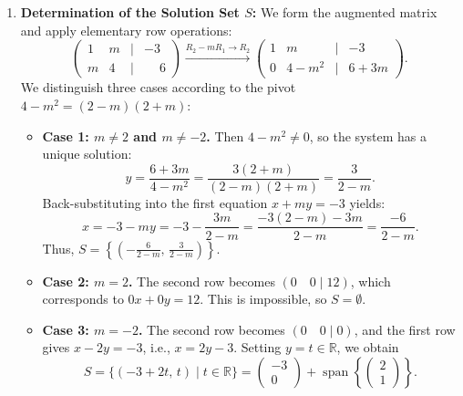 \begin{exercisesolution*}
\label{sol:parametric_linear_system_subspace}
\begin{enumerate}[label=\textbf{(\alph*)}]
    \item \textbf{Determination of the Solution Set $S$:}
    We form the augmented matrix and apply elementary row operations:
    \[
    \begin{pmatrix}
    1 & m & \big| & -3 \\
    m & 4 & \big| & \phantom{-}6
    \end{pmatrix}
    \xrightarrow{R_2 - m R_1 \to R_2}
    \begin{pmatrix}
    1 & m & \big| & -3 \\
    0 & 4 - m^2 & \big| & 6 + 3m
    \end{pmatrix}.
    \]
    We distinguish three cases according to the pivot $4 - m^2 = (2 - m)(2 + m)$:
    \begin{itemize}
        \item \textbf{Case 1: $m \ne 2$ and $m \ne -2$.}
        Then $4 - m^2 \ne 0$, so the system has a unique solution:
        \[
        y = \frac{6 + 3m}{4 - m^2} = \frac{3(2 + m)}{(2 - m)(2 + m)} = \frac{3}{2 - m}.
        \]
        Back-substituting into the first equation $x + my = -3$ yields:
        \[
        x = -3 - my = -3 - \frac{3m}{2 - m} = \frac{-3(2 - m) - 3m}{2 - m} = \frac{-6}{2 - m}.
        \]
        Thus, $S = \left\{ \left(-\frac{6}{2 - m}, \, \frac{3}{2 - m}\right) \right\}$.
        \item \textbf{Case 2: $m = 2$.}
        The second row becomes $(0 \quad 0 \mid 12)$, which corresponds to $0x + 0y = 12$. This is impossible, so $S = \emptyset$.
        \item \textbf{Case 3: $m = -2$.}
        The second row becomes $(0 \quad 0 \mid 0)$, and the first row gives $x - 2y = -3$, i.e., $x = 2y - 3$. Setting $y = t \in \mathbb{R}$, we obtain
        \[
        S = \{(-3 + 2t, \, t) \mid t \in \mathbb{R}\} = \begin{pmatrix} -3 \\ 0 \end{pmatrix} + \operatorname{span}\left\{\begin{pmatrix} 2 \\ 1 \end{pmatrix}\right\}.
        \]
    \end{itemize}


\end{enumerate}
\end{exercisesolution*}
